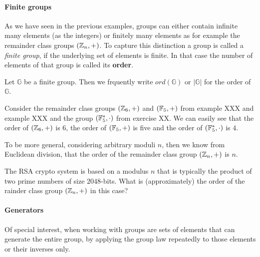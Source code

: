 \paragraph{Finite groups} As we have seen in the previous examples, groups can either contain infinite many elements (as the integers) or finitely many elements as for example the remainder class groups $(\mathbb{Z}_n,+)$. To capture this distinction a group is called a \textit{finite group}, if the underlying set of elements is finite. In that case the number of elements of that group is called its \textbf{order}.
\begin{notation}
Let $\mathbb{G}$ be a finite group. Then we frquently write $ord(\mathbb{G})$ or  $|\mathbb{G}|$ for the order of $\mathbb{G}$.
\end{notation}
\begin{example}
Consider the remainder class groups $(\mathbb{Z}_6,+)$ and $(\mathbb{F}_5,+)$ from example XXX and example XXX and the group $(\mathbb{F}_5^*,\cdot)$ from exercise XX. We can easily see that the order of $(\mathbb{Z}_6,+)$ is $6$, the order of $(\mathbb{F}_5,+)$ is five and the order of $(\mathbb{F}_5^*,\cdot)$ is $4$.

To be more general, considering arbitrary moduli $n$, then we know from Euclidean division, that the order of the remainder class group $(\mathbb{Z}_n,+)$ is $n$.
\end{example}
\begin{exercise}The RSA crypto system is based on a modulus $n$ that is typically the product of two prime numbers of size $2048$-bits. What is (approximately) the order of the rainder class group $(\mathbb{Z}_n,+)$ in this case?
\end{exercise}
\paragraph{Generators} Of special interest, when working with groups are sets of elements that can generate the entire group, by applying the group law repeatedly to those elements or their inverses only.


